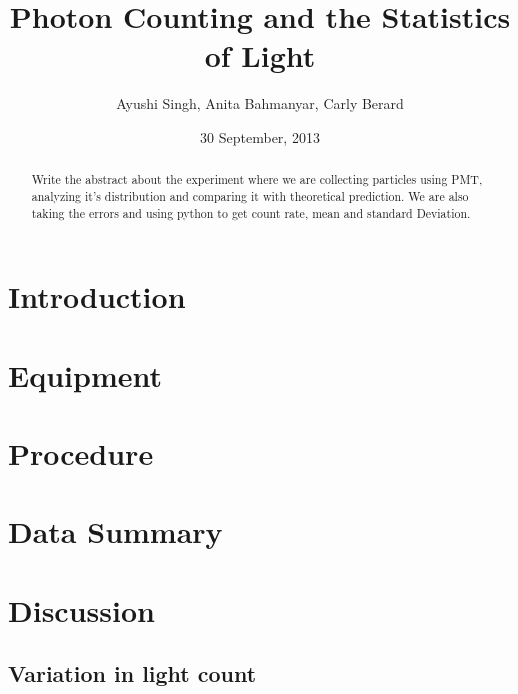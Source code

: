 \documentclass[a4paper,12pt]{article}
\makeatletter
\newcommand{\myemail}{ayushi.singh@mail.utoronto.ca}
\makeatother
\begin{document}
\onehalfspacing
\title{Photon Counting and the Statistics of Light}
\author{Ayushi Singh, Anita Bahmanyar, Carly Berard}
\date{30 September, 2013}
\maketitle
\begin{abstract}
\label{abstract}
Write the abstract about the experiment where we are collecting particles using PMT, analyzing it's distribution and comparing it with theoretical prediction. We are also taking the errors and using python to get count rate, mean and standard Deviation.
\end{abstract}

\section{Introduction}
\label{sec:introduction}

\section{Equipment}
\label{sec:equipment}

\section{Procedure}
\label{sec:procedure}

\section{Data Summary}
\label{sec:data}

\section{Discussion}
\label{sec:diccussion}

\subsection{Variation in light count} 
\label{sec:light}
\end{document}

